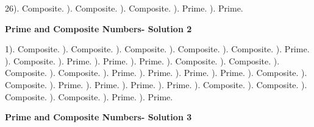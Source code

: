 \documentclass{article}%
\begin{document}
26). Composite.%
). Composite.%
). Composite.%
). Prime.%
). Prime.%
\newline%
\newpage%
\large%
\begin{center}%
\textbf{Prime and Composite Numbers- Solution 2}%
\newline%
\end{center} \normalsize%
1). Composite.%
). Composite.%
). Composite.%
). Composite.%
). Composite.%
). Prime.%
). Composite.%
). Prime.%
). Prime.%
). Prime.%
). Composite.%
). Composite.%
). Composite.%
). Composite.%
). Prime.%
). Prime.%
). Prime.%
). Prime.%
). Composite.%
). Composite.%
). Prime.%
). Prime.%
). Prime.%
). Prime.%
). Composite.%
). Composite.%
). Composite.%
). Composite.%
). Prime.%
). Prime.%
\newline%
\newpage%
\large%
\begin{center}%
\textbf{Prime and Composite Numbers- Solution 3}%
\newline%
\end{center} \normalsize%
\end{document}
